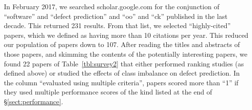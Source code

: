 \documentclass[10pt,conference]{IEEEtran}
\theoremstyle{break}
\theoremstyle{break}
\newcommand{\tion}[1]{{\S}\ref{sect:#1}}
\begin{document}
 In February  2017,  we searched
scholar.google.com for the conjunction of ``software'' and ``defect prediction'' and ``oo'' and ``ck'' published in the last decade. This returned 231 results.
From that list, we selected ``highly-cited'' papers, which we defined as having more than 10 citations per year.  This reduced our population of papers down to 107.
After reading the titles and abstracts of those papers, and skimming the contents of the potentially interesting papers, we found 22 papers of Table~\ref{tbl:survey2} that either performed ranking studies
(as defined above) or studied the effects of class imbalance on defect prediction. In the column ``evaluated using
multiple criteria'',
papers scored more than ``1'' if they used multiple performance scores  of the kind listed at the end of \tion{performance}. 
\end{document}
